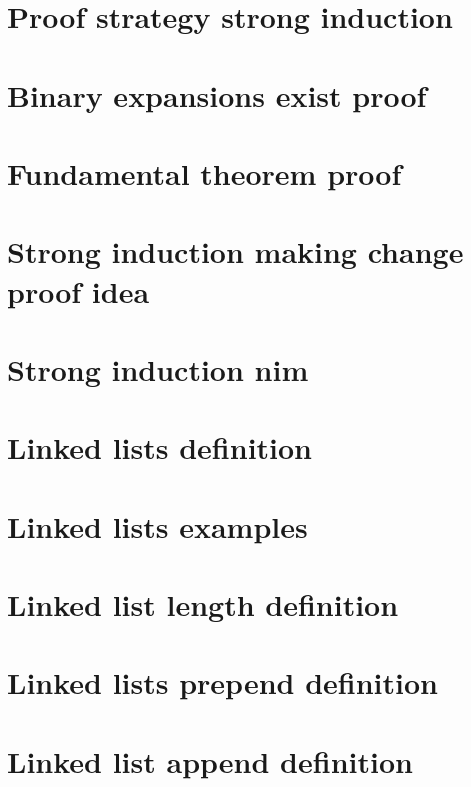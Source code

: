 \section*{Proof strategy strong induction}

\vfill
\section*{Binary expansions exist proof}

\vfill
\section*{Fundamental theorem proof}

\vfill
\section*{Strong induction making change proof idea}

\vfill
\section*{Strong induction nim}

\vfill
\section*{Linked lists definition}

\vfill
\section*{Linked lists examples}

\vfill
\section*{Linked list length definition}

\vfill
\section*{Linked lists prepend definition}

\vfill
\section*{Linked list append definition}

\vfill
